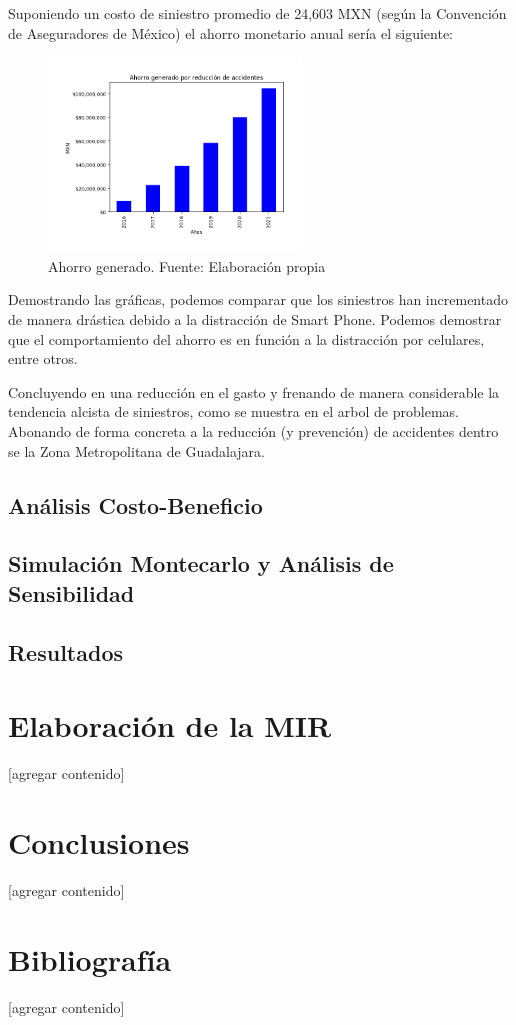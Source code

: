 \documentclass{article}
\begin{document}
Suponiendo un costo de siniestro promedio de 24,603 MXN (según la Convención de Aseguradores de México) el ahorro
monetario anual sería el siguiente:

	\begin{figure}[H]\centering
	\includegraphics[width=0.6\textwidth]{resources/img/accident_savings.png}
	\caption{\label{fig:accident_savings} Ahorro generado. Fuente: Elaboración propia}
    \end{figure}


 Demostrando las gráficas, podemos comparar que los siniestros han incrementado de manera drástica debido a la distracción de Smart Phone. Podemos demostrar que el comportamiento del ahorro es en función a la distracción por celulares, entre otros. 
 
Concluyendo en una reducción en el gasto y frenando de manera considerable la tendencia alcista de siniestros, como se muestra en el arbol de problemas. Abonando de forma concreta a la reducción (y prevención) de accidentes dentro se la Zona Metropolitana de Guadalajara. 


\subsection{Análisis Costo-Beneficio}
% 
% 

\subsection{Simulación Montecarlo y Análisis de Sensibilidad}

\subsection{Resultados}
% 
% 

\newpage
\section{Elaboración de la MIR}\label{sec:mir}
[agregar contenido]

\newpage
\section{Conclusiones}\label{sec:conclutions}
[agregar contenido]

\newpage
\section{Bibliografía}\label{sec:references}
[agregar contenido]
\end{document}
